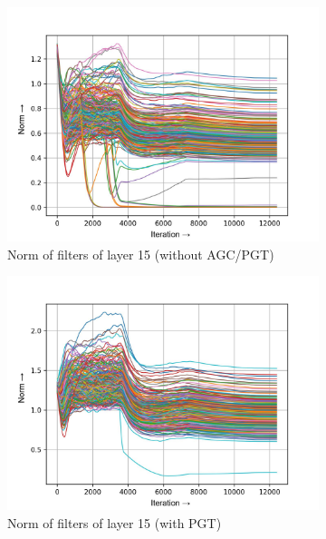 \documentclass[times,sort&compress]{elsarticle}
\begin{document}
\begin{figure}[t]
\centering
\captionsetup{font=scriptsize}

\begin{subfigure}[t]{0.33\textwidth}
\includegraphics[width=\textwidth]{baseline-w-layer-5-3}
\caption{Norm of filters of layer 15 (without AGC/PGT)}
\end{subfigure}
\begin{subfigure}[t]{0.33\textwidth}
\includegraphics[width=\textwidth]{pgt-w-layer-5-3}
\caption{Norm of filters of layer 15 (with PGT)}
\end{subfigure}
\begin{subfigure}[t]{0.33\textwidth}

\end{subfigure}
\end{figure}
\end{document}
